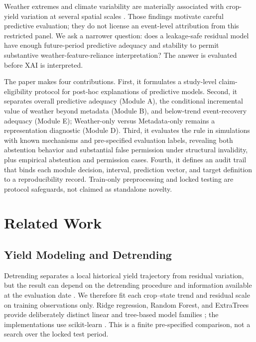 \documentclass[conference]{IEEEtran}
\begin{document}
Weather extremes and climate variability are materially associated with crop-yield
variation at several spatial scales \cite{Lesk2016,Ray2015,SchlenkerRoberts2009,Zampieri2017,Schierhorn2021}.
Those findings motivate careful predictive evaluation; they do not license an
event-level attribution from this restricted panel. We ask a narrower question:
does a leakage-safe residual model have enough future-period predictive adequacy and stability
to permit substantive weather-feature-reliance interpretation? The answer is
evaluated before XAI is interpreted.

The paper makes four contributions. First, it formulates a study-level
claim-eligibility protocol for post-hoc explanations of predictive models. Second,
it separates overall predictive adequacy (Module A), the conditional incremental
value of weather beyond metadata (Module B), and below-trend event-recovery
adequacy (Module E); Weather-only versus Metadata-only remains a representation diagnostic
(Module D). Third, it evaluates the rule in simulations with known mechanisms and
pre-specified evaluation labels, revealing both abstention behavior and
substantial false permission under structural invalidity, plus empirical
abstention and permission cases. Fourth, it
defines an audit trail that binds each module decision, interval, prediction vector, and
target definition to a reproducibility record. Train-only preprocessing and locked
testing are protocol safeguards, not claimed as standalone novelty.

\section{Related Work}
\subsection{Yield Modeling and Detrending}
Detrending separates a local historical yield trajectory from residual variation,
but the result can depend on the detrending procedure and information available at
the evaluation date \cite{Lu2017,Meng2024}. We therefore fit each crop--state trend
and residual scale on training observations only. Ridge regression, Random Forest,
and ExtraTrees provide deliberately distinct linear and tree-based model families
\cite{HoerlKennard1970,Breiman2001,Geurts2006}; the implementations use
scikit-learn \cite{Pedregosa2011}. This is a finite pre-specified comparison, not
a search over the locked test period.
\end{document}
